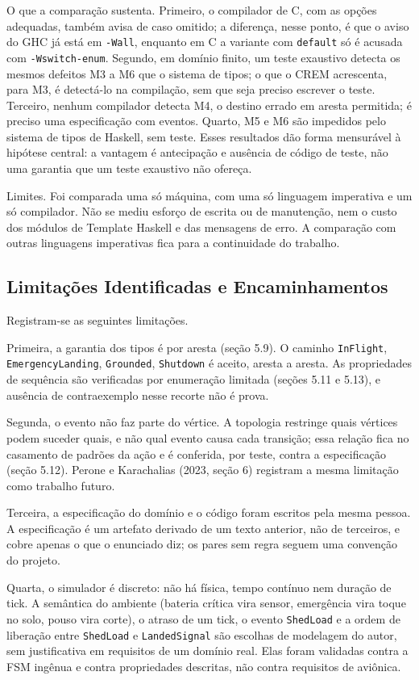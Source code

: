 \documentclass[12pt,a4paper]{article}
\begin{document}
O que a comparação sustenta. Primeiro, o compilador de C, com as opções adequadas, também avisa de caso omitido; a diferença, nesse ponto, é que o aviso do GHC já está em \texttt{-Wall}, enquanto em C a variante com \texttt{default} só é acusada com \texttt{-Wswitch-enum}. Segundo, em domínio finito, um teste exaustivo detecta os mesmos defeitos M3 a M6 que o sistema de tipos; o que o CREM acrescenta, para M3, é detectá-lo na compilação, sem que seja preciso escrever o teste. Terceiro, nenhum compilador detecta M4, o destino errado em aresta permitida; é preciso uma especificação com eventos. Quarto, M5 e M6 são impedidos pelo sistema de tipos de Haskell, sem teste. Esses resultados dão forma mensurável à hipótese central: a vantagem é antecipação e ausência de código de teste, não uma garantia que um teste exaustivo não ofereça.

Limites. Foi comparada uma só máquina, com uma só linguagem imperativa e um só compilador. Não se mediu esforço de escrita ou de manutenção, nem o custo dos módulos de Template Haskell e das mensagens de erro. A comparação com outras linguagens imperativas fica para a continuidade do trabalho.

\subsection{Limitações Identificadas e Encaminhamentos}

Registram-se as seguintes limitações.

Primeira, a garantia dos tipos é por aresta (seção 5.9). O caminho \texttt{InFlight}, \texttt{EmergencyLanding}, \texttt{Grounded}, \texttt{Shutdown} é aceito, aresta a aresta. As propriedades de sequência são verificadas por enumeração limitada (seções 5.11 e 5.13), e ausência de contraexemplo nesse recorte não é prova.

Segunda, o evento não faz parte do vértice. A topologia restringe quais vértices podem suceder quais, e não qual evento causa cada transição; essa relação fica no casamento de padrões da ação e é conferida, por teste, contra a especificação (seção 5.12). Perone e Karachalias (2023, seção 6) registram a mesma limitação como trabalho futuro.

Terceira, a especificação do domínio e o código foram escritos pela mesma pessoa. A especificação é um artefato derivado de um texto anterior, não de terceiros, e cobre apenas o que o enunciado diz; os pares sem regra seguem uma convenção do projeto.

Quarta, o simulador é discreto: não há física, tempo contínuo nem duração de tick. A semântica do ambiente (bateria crítica vira sensor, emergência vira toque no solo, pouso vira corte), o atraso de um tick, o evento \texttt{ShedLoad} e a ordem de liberação entre \texttt{ShedLoad} e \texttt{LandedSignal} são escolhas de modelagem do autor, sem justificativa em requisitos de um domínio real. Elas foram validadas contra a FSM ingênua e contra propriedades descritas, não contra requisitos de aviônica.
\end{document}
